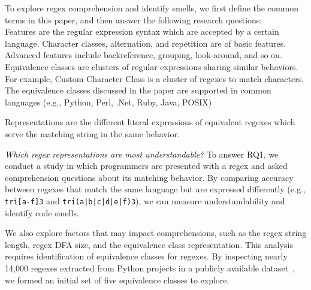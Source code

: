 To explore regex comprehension and identify smells, we first define the common terms in this paper, and then answer the following research questions: \\
 Features are the regular expression syntax which are accepted by a certain language. Character classes, alternation, and repetition are of basic features. Advanced features include backreference, grouping, look-around, and so on.
 Equivalence classes are clusters of regular expressions sharing similar behaviors. For example, Custom Character Class is a cluster of regexes to match characters. The equivalence classes discussed in the paper are supported in common languages (e.g., Python, Perl, .Net, Ruby, Java, POSIX)

 Representations are the different literal expressions of equivalent regexes which serve the matching string in the same behavior.

 {\em Which regex representations are most understandable?}
To answer RQ1, we conduct a study in which programmers are presented with a regex and asked comprehension questions about its matching behavior. By comparing accuracy between regexes that match the same language but are expressed differently (e.g., \verb!tri[a-f]3! and \verb!tri(a|b|c|d|e|f)3!), we can measure understandability and identify code smells.

We also explore factors that may impact comprehensions, such as the regex string length, regex DFA size, and the equivalence class representation.
This analysis requires identification of equivalence classes for regexes. By inspecting nearly 14,000 regexes extracted from Python projects in a publicly available dataset~\cite{chapman2016}, we formed an initial set of five equivalence classes to explore. \\


